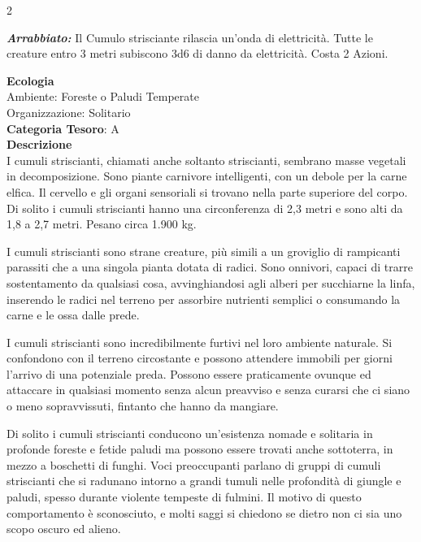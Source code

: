 \begin{multicols}{2}
{\emph{\textbf{Arrabbiato:}} Il Cumulo strisciante rilascia un'onda di elettricità. Tutte le creature entro 3 metri subiscono 3d6 di danno da elettricità. Costa 2 Azioni.

\textbf{Ecologia}\\
Ambiente: Foreste o Paludi Temperate\\
Organizzazione: Solitario\\
\textbf{Categoria Tesoro}: A\\
\textbf{Descrizione}\\
I cumuli striscianti, chiamati anche soltanto striscianti, sembrano masse vegetali in decomposizione. Sono piante carnivore intelligenti, con un debole per la carne elfica. Il cervello e gli organi sensoriali si trovano nella parte superiore del corpo. Di solito i cumuli striscianti hanno una circonferenza di 2,3 metri e sono alti da 1,8 a 2,7 metri. Pesano circa 1.900 kg.

I cumuli striscianti sono strane creature, più simili a un groviglio di rampicanti parassiti che a una singola pianta dotata di radici. Sono onnivori, capaci di trarre sostentamento da qualsiasi cosa, avvinghiandosi agli alberi per succhiarne la linfa, inserendo le radici nel terreno per assorbire nutrienti semplici o consumando la carne e le ossa dalle prede.

I cumuli striscianti sono incredibilmente furtivi nel loro ambiente naturale. Si confondono con il terreno circostante e possono attendere immobili per giorni l'arrivo di una potenziale preda. Possono essere praticamente ovunque ed attaccare in qualsiasi momento senza alcun preavviso e senza curarsi che ci siano o meno sopravvissuti, fintanto che hanno da mangiare.

Di solito i cumuli striscianti conducono un'esistenza nomade e solitaria in profonde foreste e fetide paludi ma possono essere trovati anche sottoterra, in mezzo a boschetti di funghi. Voci preoccupanti parlano di gruppi di cumuli striscianti che si radunano intorno a grandi tumuli nelle profondità di giungle e paludi, spesso durante violente tempeste di fulmini. Il motivo di questo comportamento è sconosciuto, e molti saggi si chiedono se dietro non ci sia uno scopo oscuro ed alieno.


}
\end{multicols}

